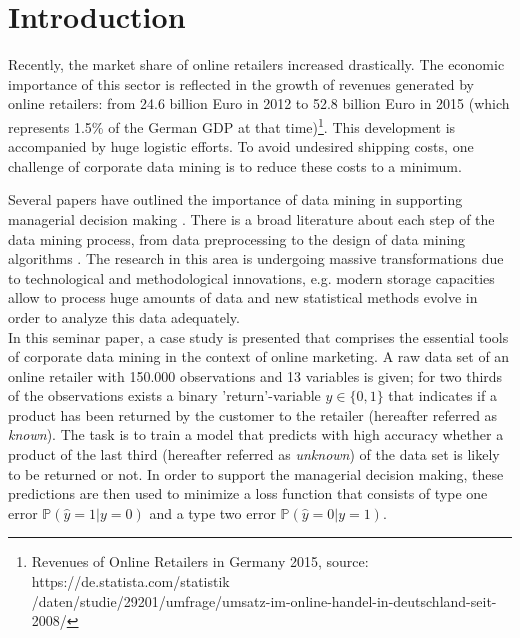 \documentclass[a4paper,12pt]{article}
\begin{document}
\thispagestyle{empty}


\newpage

\section{Introduction}

Recently, the market share of online retailers increased drastically. The economic importance of this sector is reflected in the growth of revenues generated by online retailers: from 24.6 billion Euro in 2012 to 52.8 billion Euro in 2015 (which represents 1.5\% of the German GDP at that time)\footnote{Revenues of Online Retailers in Germany 2015, source: https://de.statista.com/statistik \\ /daten/studie/29201/umfrage/umsatz-im-online-handel-in-deutschland-seit-2008/}. This development is accompanied by huge logistic efforts. To avoid undesired shipping costs, one challenge of corporate data mining is to reduce these costs to a minimum.

Several papers have outlined the importance of data mining in supporting managerial decision making \cite{manyika2011}. There is a broad literature about each step of the data mining process, from data preprocessing \cite{crone2006} to the design of data mining algorithms \cite{lessmann2015}. The research in this area is undergoing massive transformations due to technological and methodological innovations, e.g. modern storage capacities allow to process huge amounts of data and new statistical methods evolve in order to analyze this data adequately. \\
In this seminar paper, a case study is presented that comprises the essential tools of corporate data mining in the context of online marketing. A raw data set of an online retailer with 150.000 observations and 13 variables is given; for two thirds of the observations exists a binary 'return'-variable $y \in \{0,1\}$ that indicates if a product has been returned by the customer to the retailer (hereafter referred as \textit{known}). The task is to train a model that predicts with high accuracy whether a product of the last third (hereafter referred as \textit{unknown}) of the data set is likely to be returned or not. In order to support the managerial decision making, these predictions are then used to minimize a loss function that consists of type one error $\mathbb{P}(\hat{y}=1|y=0)$ and a type two error $\mathbb{P}(\hat{y}=0|y=1)$.  \\
\end{document}
